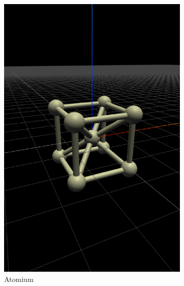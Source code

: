 \begin{figure}
\begin{subfigure}[b]{0.25\linewidth}
    \includegraphics[width=1.0\linewidth]{./images/all_examples/atomium_crop}
    \caption{Atomium}
    \label{fig:ex:atomium}
  \end{subfigure}
  \begin{subfigure}[b]{0.25\linewidth}

\end{subfigure}
\end{figure}

